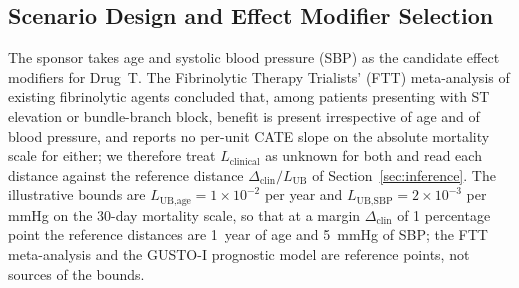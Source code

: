 \documentclass[AMA,Times1COL]{WileyNJDv5}
\begin{document}
\subsection{Scenario Design and Effect Modifier Selection}\label{sec:app_scenario}

The sponsor takes age and systolic blood pressure (SBP) as the candidate effect modifiers for Drug~T. The Fibrinolytic Therapy Trialists' (FTT) meta-analysis of existing fibrinolytic agents\cite{ftt1994} concluded that, among patients presenting with ST elevation or bundle-branch block, benefit is present irrespective of age and of blood pressure, and reports no per-unit CATE slope on the absolute mortality scale for either; we therefore treat $L_{\text{clinical}}$ as unknown for both and read each distance against the reference distance $\Delta_{\text{clin}} / L_{\text{UB}}$ of Section~\ref{sec:inference}. The illustrative bounds are $L_{\text{UB,age}} = 1 \times 10^{-2}$ per year and $L_{\text{UB,SBP}} = 2 \times 10^{-3}$ per mmHg on the 30-day mortality scale, so that at a margin $\Delta_{\text{clin}}$ of 1 percentage point the reference distances are 1~year of age and 5~mmHg of SBP; the FTT meta-analysis\cite{ftt1994} and the GUSTO-I prognostic model\cite{lee1995} are reference points, not sources of the bounds.
\end{document}

